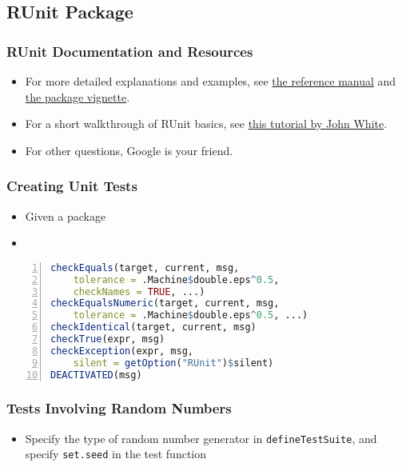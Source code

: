 \documentclass{beamer}
\begin{document}
\subsection{RUnit Package}
\begin{frame}

\frametitle{RUnit Documentation and Resources}

\begin{itemize}
\item For more detailed explanations and examples, see \href{https://cran.r-project.org/web/packages/RUnit/RUnit.pdf}{the reference manual} and \href{https://cran.r-project.org/web/packages/RUnit/vignettes/RUnit.pdf}{the package vignette}.
\item For a short walkthrough of RUnit basics, see \href{http://www.johnmyleswhite.com/notebook/2010/08/17/unit-testing-in-r-the-bare-minimum/}{this tutorial by John White}.
\item For other questions, Google is your friend.
\end{itemize}

\end{frame}

\begin{frame}[fragile]
\frametitle{Creating Unit Tests}

\begin{itemize}
\item Given a package 
\item
\end{itemize}

\begin{lstlisting}[language=R, numbers = left]
checkEquals(target, current, msg,
	tolerance = .Machine$double.eps^0.5,
	checkNames = TRUE, ...)
checkEqualsNumeric(target, current, msg,
	tolerance = .Machine$double.eps^0.5, ...)
checkIdentical(target, current, msg)
checkTrue(expr, msg)
checkException(expr, msg,
	silent = getOption("RUnit")$silent)
DEACTIVATED(msg)
\end{lstlisting}
\end{frame}

\begin{frame}
\frametitle{Tests Involving Random Numbers}

\begin{itemize}
\item Specify the type of random number generator in \texttt{defineTestSuite}, and specify \texttt{set.seed} in the test function
\end{itemize}

\end{frame}
\end{document}
